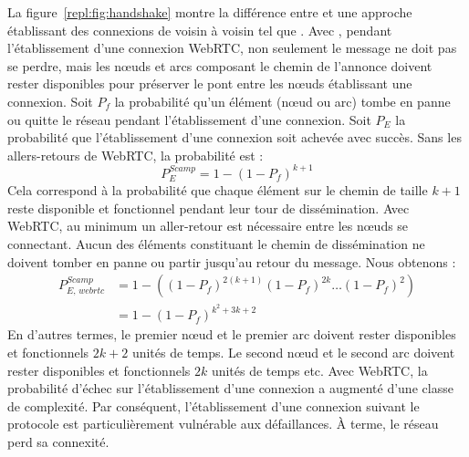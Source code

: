 \noindent La figure~\ref{repl:fig:handshake} montre la différence entre \SCAMP
et une approche établissant des connexions de voisin à voisin tel que
\CYCLON. Avec \SCAMP, pendant l'établissement d'une connexion WebRTC, non
seulement le message ne doit pas se perdre, mais les nœuds et arcs composant le
chemin de l'annonce doivent rester disponibles pour préserver le pont entre les
nœuds établissant une connexion.  Soit $P_f$ la probabilité qu'un élément (nœud
ou arc) tombe en panne ou quitte le réseau pendant l'établissement d'une
connexion. Soit $P_E$ la probabilité que l'établissement d'une connexion soit
achevée avec succès. Sans les allers-retours de WebRTC, la probabilité est :
\begin{equation} P_{E}^{Scamp}=1-(1- P_f)^{k+1} \end{equation} Cela
correspond à la probabilité que chaque élément sur le chemin de taille $k+1$
reste disponible et fonctionnel pendant leur tour de dissémination. Avec WebRTC,
au minimum un aller-retour est nécessaire entre les nœuds se connectant. Aucun
des éléments constituant le chemin de dissémination ne doivent tomber en panne
ou partir jusqu'au retour du message. Nous obtenons : 
\begin{align} P_{E,\,webrtc}^{Scamp} &=1 - ((1-P_f)^{2(k+1)} (1-P_f)^{2k}
                                     \ldots (1-P_f)^2) \nonumber \\
                                   &=1-(1-P_f)^{k^2+3k+2}
\end{align}
En d'autres termes, le premier nœud et le premier arc doivent rester disponibles
et fonctionnels $2k +2$ unités de temps. Le second nœud et le second arc doivent
rester disponibles et fonctionnels $2k$ unités de temps etc. Avec WebRTC, la
probabilité d'échec sur l'établissement d'une connexion a augmenté d'une classe
de complexité.  Par conséquent, l'établissement d'une connexion suivant le
protocole \SCAMP est particulièrement vulnérable aux défaillances. À terme, le
réseau perd sa connexité.





